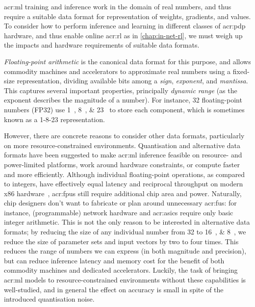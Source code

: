 \gls{acr:ml} training and inference work in the domain of real numbers, and thus require a suitable data format for representation of weights, gradients, and values.
To consider how to perform inference and learning in different classes of \gls{acr:pdp} hardware, and thus enable online \gls{acr:rl} as in \cref{chap:in-net-rl}, we must weigh up the impacts and hardware requirements of suitable data formats.

%

\emph{Floating-point arithmetic} is the canonical data format for this purpose, and allows commodity machines and accelerators to approximate real numbers using a fixed-size representation, dividing available bits among a \emph{sign}, \emph{exponent}, and \emph{mantissa}.
This captures several important properties, principally \emph{dynamic range} (as the exponent describes the magnitude of a number).
For instance, \qty{32}{\bit} floating-point numbers (FP32) use \qtylist{1; 8; 23}{\bit} to store each component, which is sometimes known as a 1-8-23 representation.

However, there are concrete reasons to consider other data formats, particularly on more resource-constrained environments.
Quantisation and alternative data formats have been suggested to make \gls{acr:ml} inference feasible on resource- and power-limited platforms, work around hardware constraints, or compute faster and more efficiently.
Although individual floating-point operations, as compared to integers, have effectively equal latency and reciprocal throughput on modern x86 hardware~\parencite{agner-x86}, \glspl{acr:fpu} still require additional chip area and power.
Naturally, chip designers don't want to fabricate or plan around unnecessary \glspl{acr:fu}: for instance, (programmable) network hardware and \glspl{acr:asic} require only basic integer arithmetic.
This is not the only reason to be interested in alternative data formats; by reducing the size of any individual number from \qty{32}{\bit} to \qtylist[list-pair-separator = { or }]{16; 8}{\bit}, we reduce the size of parameter sets and input vectors by two to four times.
This reduces the range of numbers we can express (in both magnitude and precision), but can reduce inference latency and memory cost for the benefit of both commodity machines and dedicated accelerators.
Luckily, the task of bringing \gls{acr:ml} models to resource-constrained environments without these capabilities is well-studied, and in general the effect on accuracy is small in spite of the introduced quantisation noise.

